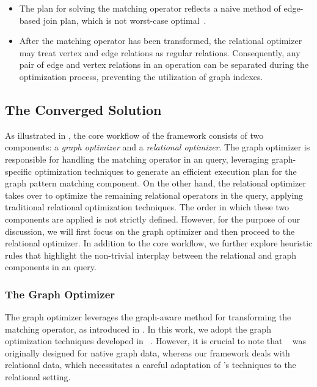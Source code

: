 \begin{itemize}
\item The plan for solving the matching operator reflects a naive method of edge-based join plan, which is not worst-case optimal~\cite{lai2019distributed,mhedhbi2019optimizing}.
\item After the matching operator has been transformed, the relational optimizer may treat vertex and edge relations as regular relations. Consequently, any pair of edge and vertex relations in an \EVjoin operation can be separated during the optimization process, preventing the utilization of graph indexes.
\end{itemize}

\subsection{The Converged Solution}
As illustrated in , the core workflow of the \name framework consists of two components: a \emph{graph optimizer} and a \emph{relational optimizer}. The graph optimizer is responsible for handling the matching operator in an \spjm query, leveraging graph-specific optimization techniques to generate an efficient execution plan for the graph pattern matching component. On the other hand, the relational optimizer takes over to optimize the remaining relational operators in the query, applying traditional relational optimization techniques.
The order in which these two components are applied is not strictly defined. However, for the purpose of our discussion, we will first focus on the graph optimizer and then proceed to the relational optimizer.
In addition to the core workflow, we further explore heuristic rules that highlight the non-trivial interplay between the relational and graph components in an \spjm query.



\subsubsection{The Graph Optimizer}
\label{sec:graph-optimizer}
The graph optimizer leverages the graph-aware method for transforming the matching operator, as introduced in . In this work, we adopt the graph optimization techniques developed in \glogs~\cite{GLogS}. However, it is crucial to note that \glogs~ was originally designed for native graph data, whereas our framework deals with relational data, which necessitates a careful adaptation of \glogs's techniques to the relational setting.

